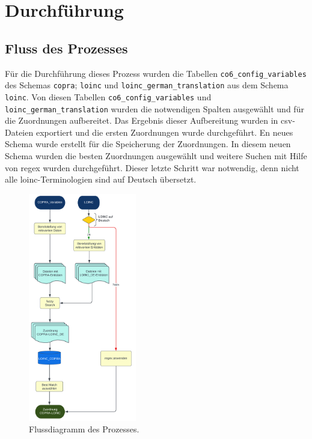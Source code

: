 \chapter{Durchführung}

\section{Fluss des Prozesses}

Für die Durchführung dieses Prozess wurden die Tabellen \texttt{co6\_config\_variables} des Schemas \texttt{copra}; \texttt{loinc} und \texttt{loinc\_german\_translation} aus dem Schema \texttt{loinc}. Von diesen Tabellen \texttt{co6\_config\_variables} und \texttt{loinc\_german\_translation} wurden die notwendigen Spalten ausgewählt und für die Zuordnungen aufbereitet. Das Ergebnis dieser Aufbereitung wurden in \ac{csv}-Dateien exportiert und die ersten Zuordnungen wurde durchgeführt. En neues Schema wurde erstellt für die Speicherung der Zuordnungen. In diesem neuen Schema wurden die besten Zuordnungen ausgewählt und weitere Suchen mit Hilfe von \ac{regex} wurden durchgeführt. Dieser letzte Schritt war notwendig, denn nicht alle \ac{loinc}-Terminologien sind auf Deutsch übersetzt.

\begin{figure}[ht]
	\centering
	\includegraphics[height=10cm]{figures/copra_loinc}
	\caption[Flussdiagramm des Prozesses]{Flussdiagramm des Prozesses.}
	\label{fig:copraloinc}
\end{figure}
